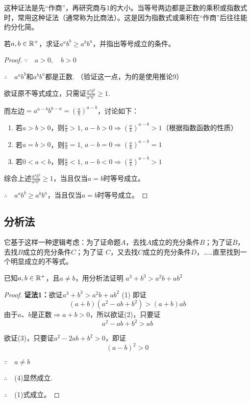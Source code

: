 \begin{rmk}
这种证法是先“作商”，再研究商与1的大小。当等号两边都是正数的乘积或指数式时，常用这种证法（通常称为比商法）。这是因为指数式或乘积在“作商”后往往能约分化简。
\end{rmk}

\begin{example}
    若$a,b\in\mathbb{R}^+$，求证$a^a b^b\ge a^b b^a$，并指出等号成立的条件。
\end{example}

\begin{proof}
$\because\quad a>0, \quad b>0$

$\therefore\quad a^a b^b$和$a^b b^a$都是正数. （验证这一点，为的是使用推论9）

欲证原不等式成立，只需证$\frac{a^a b^b}{a^b b^a}\ge 1$.

而左边$=a^{a-b}b^{b-a}=\left(\frac{a}{b}\right)^{a-b}$，讨论如下：
\begin{enumerate}
    \item 若$a>b>0$，则$\frac{a}{b}>1$, $a-b>0\Longrightarrow \left(\frac{a}{b}\right)^{a-b}>1$（根据指数函数的性质）
    \item 若$a=b>0$，则$\frac{a}{b}=1$, $a-b=0\Longrightarrow \left(\frac{a}{b}\right)^{a-b}=1$
    \item 若$0<a<b$，则$\frac{a}{b}<1$, $a-b<0\Longrightarrow \left(\frac{a}{b}\right)^{a-b}>1$
\end{enumerate}
综合上述$\frac{a^a b^b}{a^b b^a}\ge 1$，当且仅当$a=b$时等号成立。

$\therefore\quad a^a b^b\ge a^b b^a$，当且仅当$a=b$时等号成立。
\end{proof}

\subsection{分析法}
它基于这样一种逻辑考虑：为了证命题$A$，去找$A$成立的充分条件$B$；为了证$B$，去找$B$成立的充分条件$C$；为了证
$C$，又去找$C$成立的充分条件$D$，……直至找到一个明显成立的不等式。

\begin{example}
    已知$a,b\in\mathbb{R}^+$，且$a\ne b$，用分析法证明
$a^3+b^3>a^2b+ab^2$
\end{example}

\begin{proof}
    \textbf{证法1：}欲证$a^3+b^3>a^2b+ab^2$ \hfill (1)
即证
\begin{equation}
    (a+b)(a^2-ab+b^2)>(a+b)ab \tag{2}
\end{equation}
由于$a$、$b$是正数$\Longrightarrow a+b>0$，所以欲证(2)，只要证
\begin{equation}
    a^2-ab+b^2>ab \tag{3}
\end{equation}

欲证(3)，只要证$a^2-2ab+b^2>0$，即证
\begin{equation}
    (a-b)^2>0\tag{4}    
\end{equation}

$\because\quad a\ne b$

$\therefore\quad $(4)显然成立.

$\therefore\quad $(1)式成立。
\end{proof}


